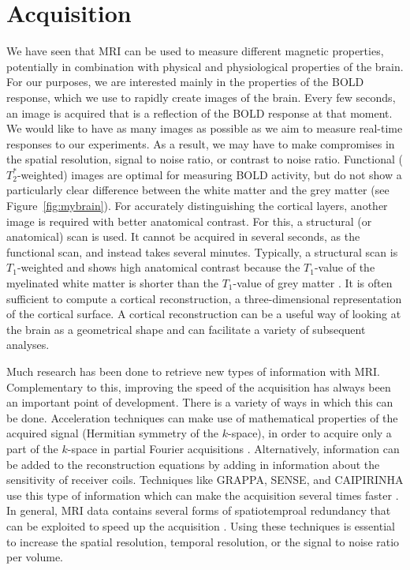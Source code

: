 \section*{Acquisition}
We have seen that MRI can be used to measure different magnetic properties, potentially in combination with physical and physiological properties of the brain. For our purposes, we are interested mainly in the properties of the BOLD response, which we use to rapidly create images of the brain. Every few seconds, an image is acquired that is a reflection of the BOLD response at that moment. We would like to have as many images as possible as we aim to measure real-time responses to our experiments. As a result, we may have to make compromises in the spatial resolution, signal to noise ratio, or contrast to noise ratio. Functional ($T_2^*$-weighted) images are optimal for measuring BOLD activity, but do not show a particularly clear difference between the white matter and the grey matter (see Figure~\ref{fig:mybrain}). For accurately distinguishing the cortical layers, another image is required with better anatomical contrast. For this, a structural (or anatomical) scan is used. It cannot be acquired in several seconds, as the functional scan, and instead takes several minutes. Typically, a structural scan is $T_1$-weighted and shows high anatomical contrast because the $T_1$-value of the myelinated white matter is shorter than the $T_1$-value of grey matter \cite{Wansapura1999}. It is often sufficient to compute a cortical reconstruction, a three-dimensional representation of the cortical surface. A cortical reconstruction can be a useful way of looking at the brain as a geometrical shape and can facilitate a variety of subsequent analyses.


Much research has been done to retrieve new types of information with MRI. Complementary to this, improving the speed of the acquisition has always been an important point of development. There is a variety of ways in which this can be done. Acceleration techniques can make use of mathematical properties of the acquired signal (Hermitian symmetry of the $k$-space), in order to acquire only a part of the $k$-space in partial Fourier acquisitions \cite{Feinberg1986}. Alternatively, information can be added to the reconstruction equations by adding in information about the sensitivity of receiver coils. Techniques like GRAPPA, SENSE, and CAIPIRINHA use this type of information which can make the acquisition several times faster \cite{Setsompop2016}. In general, MRI data contains several forms of spatiotemproal redundancy that can be exploited to speed up the acquisition \cite{Tsao2012}. Using these techniques is essential to increase the spatial resolution, temporal resolution, or the signal to noise ratio per volume.

